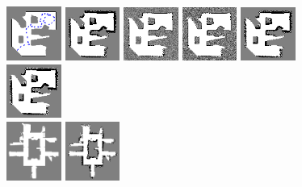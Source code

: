 \documentclass[letterpaper, 10 pt, conference]{ieeeconf} %
\begin{document}
\begin{figure}
  \includegraphics[width=0.16\textwidth]{../../Data/cave_player/gt-final.png}%
  \includegraphics[width=0.16\textwidth]{../../Data/cave_player/TwoAssumptionAlgo.png}%
  \includegraphics[width=0.16\textwidth]{../../Data/cave_player/SICKSlowMetropolis.png}%
  \includegraphics[width=0.16\textwidth]{../../Data/cave_player/SICKDDMCMC.png}%
  \includegraphics[width=0.16\textwidth]{../../Data/cave_player/run_belief_propagation.png}%
  \includegraphics[width=0.16\textwidth]{../../Data/cave_player/dualdecomposition.png}\\
  \includegraphics[width=0.16\textwidth]{../../Data/hospital_player/gt-final.png}%
  \includegraphics[width=0.16\textwidth]{../../Data/hospital_player/TwoAssumptionAlgo.png}%

\end{figure}
\end{document}
